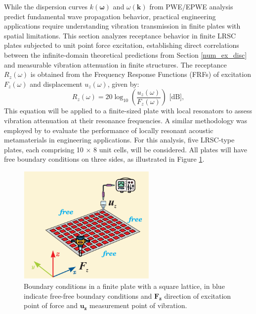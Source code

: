 \documentclass[review,numbers,sort&compress]{elsarticle}
\begin{document}
While the dispersion curves $k(\boldsymbol{\omega})$ and $\omega(\boldsymbol{k})$ from PWE/EPWE analysis predict fundamental wave propagation behavior, practical engineering applications require understanding vibration transmission in finite plates with spatial limitations. This section analyzes receptance behavior in finite LRSC plates subjected to unit point force excitation, establishing direct correlations between the infinite-domain theoretical predictions from Section \ref{num_ex_disc} and measurable vibration attenuation in finite structures. The receptance  $R_z(\omega)$  is obtained from the Frequency Response Functions (FRFs) of excitation $F_z(\omega)$ and displacement $u_z(\omega)$, given by:
\begin{equation}
	R_z(\omega) = 20 \log_{10} \left( \frac{u_z(\omega)}{F_z(\omega)} \right) \text{ [dB]},
	\label{receptance}
\end{equation}
This equation will be applied to a finite-sized plate with local resonators to assess vibration attenuation at their resonance frequencies. A similar methodology was employed by \cite{MIRANDA2019480} to evaluate the performance of locally resonant acoustic metamaterials in engineering applications. For this analysis, five LRSC-type plates, each comprising 10 × 8 unit cells, will be considered. All plates will have free boundary conditions on three sides, as illustrated in Figure \ref{bound_frf_modal}.

\begin{figure}[htb]
	\centering
	\includegraphics[width=0.6\textwidth]{ilustr_bound_force_frf_modal.pdf}
	\caption{Boundary conditions in a finite plate with a square lattice, in blue indicate free-free boundary conditions and $\mathbf{F_z}$ direction of excitation point of force and $\mathbf{u_z}$ measurement point of vibration.}
	\label{bound_frf_modal}
\end{figure}
\end{document}
